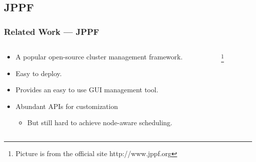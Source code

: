 \subsection{JPPF}
\begin{frame}
  \frametitle{Related Work --- JPPF}
  \begin{columns}
    \begin{column}{.6\textwidth}
      \begin{itemize}
        \item A popular open-source cluster management framework.
        \item Easy to deploy.
        \item Provides an easy to use GUI management tool.
        \item Abundant APIs for customization
          \begin{itemize}
            \item But still hard to achieve node-aware scheduling.
          \end{itemize}
      \end{itemize}
    \end{column}
    \begin{column}{.4\textwidth}
      \footnote[frame]{\tiny Picture is from the official site
      http://www.jppf.org}
    \end{column}
  \end{columns}
\end{frame}
